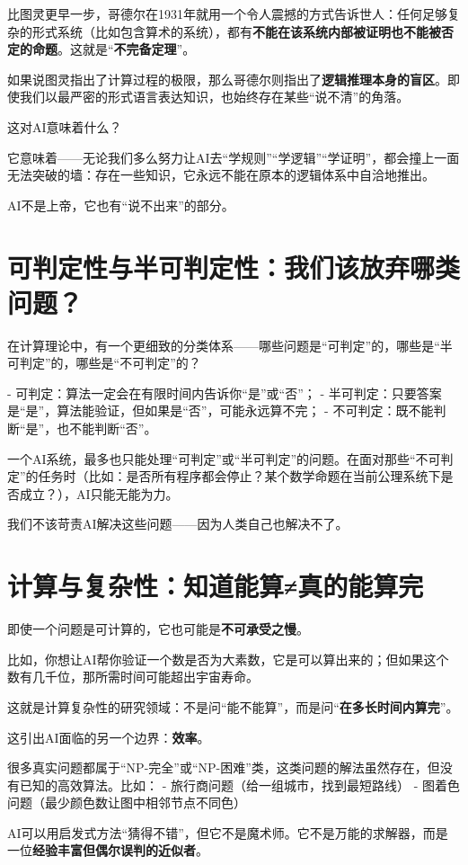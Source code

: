比图灵更早一步，哥德尔在1931年就用一个令人震撼的方式告诉世人：任何足够复杂的形式系统（比如包含算术的系统），都有\textbf{不能在该系统内部被证明也不能被否定的命题}。这就是“\textbf{不完备定理}”。

如果说图灵指出了计算过程的极限，那么哥德尔则指出了\textbf{逻辑推理本身的盲区}。即使我们以最严密的形式语言表达知识，也始终存在某些“说不清”的角落。

这对AI意味着什么？

它意味着——无论我们多么努力让AI去“学规则”“学逻辑”“学证明”，都会撞上一面无法突破的墙：存在一些知识，它永远不能在原本的逻辑体系中自洽地推出。

AI不是上帝，它也有“说不出来”的部分。

\section*{可判定性与半可判定性：我们该放弃哪类问题？}

在计算理论中，有一个更细致的分类体系——哪些问题是“可判定”的，哪些是“半可判定”的，哪些是“不可判定”的？

- 可判定：算法一定会在有限时间内告诉你“是”或“否”；
- 半可判定：只要答案是“是”，算法能验证，但如果是“否”，可能永远算不完；
- 不可判定：既不能判断“是”，也不能判断“否”。

一个AI系统，最多也只能处理“可判定”或“半可判定”的问题。在面对那些“不可判定”的任务时（比如：是否所有程序都会停止？某个数学命题在当前公理系统下是否成立？），AI只能无能为力。

我们不该苛责AI解决这些问题——因为人类自己也解决不了。

\section*{计算与复杂性：知道能算≠真的能算完}

即使一个问题是可计算的，它也可能是\textbf{不可承受之慢}。

比如，你想让AI帮你验证一个数是否为大素数，它是可以算出来的；但如果这个数有几千位，那所需时间可能超出宇宙寿命。

这就是计算复杂性的研究领域：不是问“能不能算”，而是问“\textbf{在多长时间内算完}”。

这引出AI面临的另一个边界：\textbf{效率}。

很多真实问题都属于“NP-完全”或“NP-困难”类，这类问题的解法虽然存在，但没有已知的高效算法。比如：
- 旅行商问题（给一组城市，找到最短路线）
- 图着色问题（最少颜色数让图中相邻节点不同色）

AI可以用启发式方法“猜得不错”，但它不是魔术师。它不是万能的求解器，而是一位\textbf{经验丰富但偶尔误判的近似者}。

